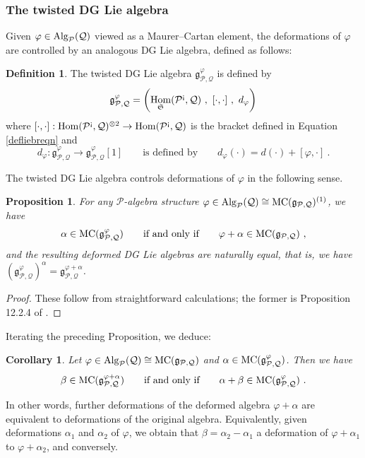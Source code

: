 \documentclass[11pt]{amsart}
\numberwithin{equation}{section}
\newtheorem{prop}[theo]{Proposition}
\newtheorem{coro}[theo]{Corollary}
\theoremstyle{definition}
\newtheorem{defn}[theo]{Definition}
\newcommand{\mc}{\mathcal}
\newcommand{\mf}{\mathfrak}
\DeclareMathOperator{\Hom}{Hom}
\newcommand{\Alg}{{\textup{Alg}}}
\newcommand{\ash}{{\textup{\mbox{!`}}}}
\newcommand{\Ss}{{{\mf{S}}}}
\newcommand{\MC}{{{\textup{MC}}}}
\newcommand{\0}{{\textbf{0}}}
\newcommand{\g}{{\mf{g}}}
\def \mf{\mathfrak}
\begin{document}
\subsubsection{The twisted DG Lie algebra} 

Given $\varphi \in \Alg_{\mc P}(\mc Q)$ viewed as a Maurer--Cartan element, the deformations of $\varphi$ are controlled by an analogous DG Lie algebra, defined as follows:

\begin{defn}\label{gvarphidef} 
The twisted DG Lie algebra $\g^\varphi_{\mc P,\mc Q}$ is defined by
	\[  
	\g^\varphi_{\mc P,\mc Q} = \left( \Hom_{\Ss}(\mc P^\ash ,\mc Q) \ , \  [ \cdot , \cdot ]   \ , \  d_\varphi  \right) 
	\]
where $[ \cdot , \cdot ]:\Hom(\mc P^\ash, \mc Q)^{\otimes 2} \to \Hom(\mc P^\ash, \mc Q) $ is the bracket defined in Equation \ref{defliebreqn} and
\begin{equation}\label{dphieqn}
	d_\varphi:\g^\varphi_{\mc P,\mc Q} \to \g^\varphi_{\mc P,\mc Q} [1] \qquad \text{is defined by} \qquad d_\varphi(\cdot) = d(\cdot) + [\varphi , \cdot] \ .
\end{equation}
\end{defn}


The twisted DG Lie algebra controls deformations of $\varphi$ in the following sense.
\begin{prop} 
For any $\mc P$-algebra structure $\varphi\in\Alg_{\mc P}(\mc Q)\cong \MC(\g_{\mc P, \mc Q})^{(1)}$, we have
\[ \alpha \in \MC(\g_{\mc P,\mc Q}^\varphi) \qquad \text{if and only if}\qquad \varphi+\alpha \in \MC(\g_{\mc P,\mc Q})  \ , \]
and the resulting deformed DG Lie algebras are naturally equal, that is, we have $(\g_{\mc P,\mc Q}^\varphi)^\alpha = \g_{\mc P,\mc Q}^{\varphi+\alpha}$.
\end{prop}
\begin{proof} These follow from straightforward calculations; the former is Proposition 12.2.4 of \cite{LV}.
\end{proof}
Iterating the preceding Proposition, we deduce:
\begin{coro} 
Let $\varphi\in\Alg_{\mc P}(\mc Q)\cong \MC(\g_{\mc P, \mc Q})$ and $\alpha \in \MC(\g_{\mc P,\mc Q}^\varphi)$. Then we have
\[
\beta \in \MC(\g_{\mc P,\mc Q}^{\varphi+\alpha}) \qquad \text{if and only if}\qquad \alpha+\beta \in \MC(\g_{\mc P,\mc Q}^\varphi) \ .  
\]
\end{coro}
In other words, further deformations of the deformed algebra $\varphi+\alpha$ are equivalent to deformations of the original algebra. Equivalently, given deformations $\alpha_1$ and $\alpha_2$ of $\varphi$, we obtain that $\beta = \alpha_2-\alpha_1$ a deformation of $\varphi+\alpha_1$ to $\varphi+\alpha_2$, and conversely.
\end{document}
